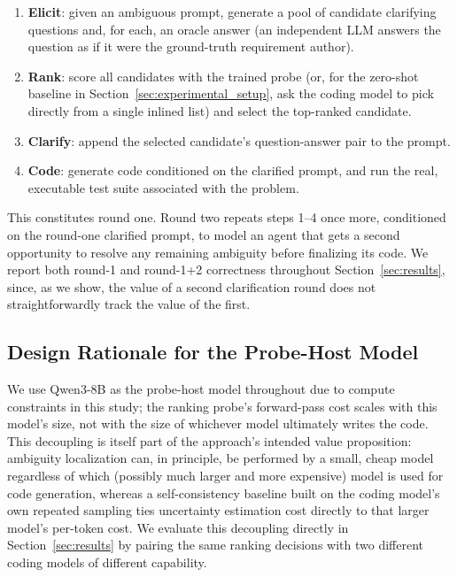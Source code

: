 \begin{enumerate}
\item \textbf{Elicit}: given an ambiguous prompt, generate a pool of
candidate clarifying questions and, for each, an oracle answer (an
independent LLM answers the question as if it were the ground-truth
requirement author).
\item \textbf{Rank}: score all candidates with the trained probe (or, for
the zero-shot baseline in Section~\ref{sec:experimental_setup}, ask the
coding model to pick directly from a single inlined list) and select the
top-ranked candidate.
\item \textbf{Clarify}: append the selected candidate's question-answer
pair to the prompt.
\item \textbf{Code}: generate code conditioned on the clarified prompt, and
run the real, executable test suite associated with the problem.
\end{enumerate}

This constitutes round one. Round two repeats steps 1--4 once more,
conditioned on the round-one clarified prompt, to model an agent that gets
a second opportunity to resolve any remaining ambiguity before finalizing
its code. We report both round-1 and round-1+2 correctness throughout
Section~\ref{sec:results}, since, as we show, the value of a second
clarification round does not straightforwardly track the value of the
first.

\subsection{Design Rationale for the Probe-Host Model}

We use Qwen3-8B as the probe-host model throughout due to compute
constraints in this study; the ranking probe's forward-pass cost scales
with this model's size, not with the size of whichever model ultimately
writes the code. This decoupling is itself part of the approach's intended
value proposition: ambiguity localization can, in principle, be performed
by a small, cheap model regardless of which (possibly much larger and more
expensive) model is used for code generation, whereas a self-consistency
baseline built on the coding model's own repeated sampling ties uncertainty
estimation cost directly to that larger model's per-token cost. We evaluate
this decoupling directly in Section~\ref{sec:results} by pairing the same
ranking decisions with two different coding models of different capability.
